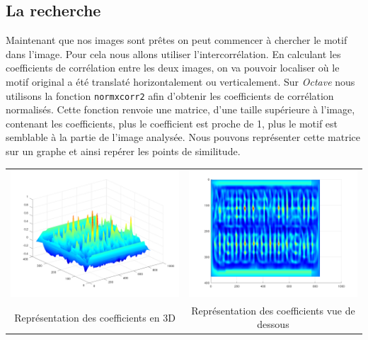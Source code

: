 \documentclass[a4paper,12pt,titlepage]{report}
\newcommand{\octave}{\textit{Octave }}
\begin{document}
	\subsection{La recherche}
	Maintenant que nos images sont prêtes on peut commencer à chercher le motif dans l'image. Pour cela nous allons utiliser l'intercorrélation. En calculant les coefficients de corrélation entre les deux images, on va pouvoir localiser où le motif original a été translaté horizontalement ou verticalement.
	Sur \octave nous utilisons la fonction \texttt{normxcorr2} afin d'obtenir les coefficients de corrélation normalisés. Cette fonction renvoie une matrice, d'une taille supérieure à l'image, contenant les coefficients, plus le coefficient est proche de 1, plus le motif est semblable à la partie de l'image analysée.
	Nous pouvons représenter cette matrice sur un graphe et ainsi repérer les points de similitude.\\
	\begin{tabular}{|c|c|}
			\includegraphics[scale=0.18]{illus/cor.png} & \includegraphics[scale=0.18]{illus/cor1.png}\\
			Représentation des coefficients en 3D  & Représentation des coefficients vue de dessous\\
	\end{tabular}\\
\end{document}
